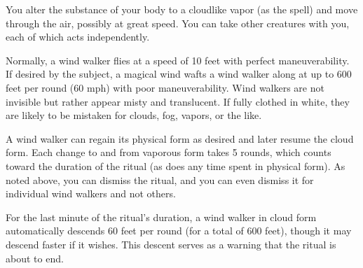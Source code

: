 \begin{spelleffect}
\par You alter the substance of your body to a cloudlike vapor (as the  spell) and move through the air, possibly at great speed. You can take other creatures with you, each of which acts independently.
\par Normally, a wind walker flies at a speed of 10 feet with perfect maneuverability. If desired by the subject, a magical wind wafts a wind walker along at up to 600 feet per round (60 mph) with poor maneuverability. Wind walkers are not invisible but rather appear misty and translucent. If fully clothed in white, they are likely to be mistaken for clouds, fog, vapors, or the like.
\par A wind walker can regain its physical form as desired and later resume the cloud form. Each change to and from vaporous form takes 5 rounds, which counts toward the duration of the ritual (as does any time spent in physical form). As noted above, you can dismiss the ritual, and you can even dismiss it for individual wind walkers and not others.
\par For the last minute of the ritual's duration, a wind walker in cloud form automatically descends 60 feet per round (for a total of 600 feet), though it may descend faster if it wishes. This descent serves as a warning that the ritual is about to end.
\end{spelleffect}
